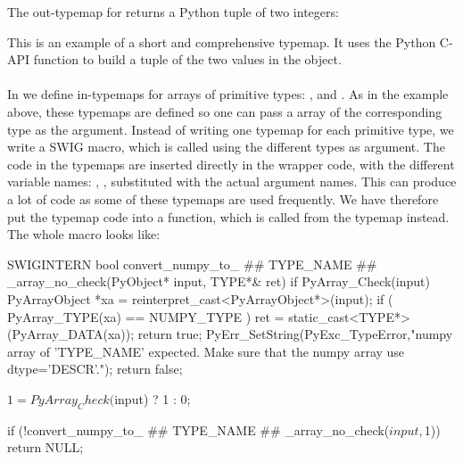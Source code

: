 The out-typemap for \-\- returns a Python tuple of two integers:
This is an example of a short and comprehensive typemap. It uses the Python C-API function  to build a tuple of the two values in the  object.\par

\paragraph{}
In  we define in-typemaps for arrays of primitive types: ,  and . As in the  example above, these typemaps are defined so one can pass a \numpy array of the corresponding type as the argument. Instead of writing one typemap for each primitive type, we write a SWIG macro, which is called using the different types as argument. The code in the typemaps are inserted directly in the wrapper code, with the different variable names:  , , substituted with the actual argument names. This can produce a lot of code as some of these typemaps are used frequently. We have therefore put the typemap code into a function, which is called from the typemap instead. The whole macro looks like:
\begin{c++}
SWIGINTERN bool convert_numpy_to_ ## TYPE_NAME ## _array_no_check(PyObject* input, TYPE*& ret)
{
  if PyArray_Check(input)
  {
    PyArrayObject *xa = reinterpret_cast<PyArrayObject*>(input);
    if ( PyArray_TYPE(xa) == NUMPY_TYPE )
    {
      ret  = static_cast<TYPE*>(PyArray_DATA(xa));
      return true;
    }
  }
  PyErr_SetString(PyExc_TypeError,"numpy array of 'TYPE_NAME' expected. Make sure that the numpy array use dtype='DESCR'.");
  return false;
}

{
    $1 = PyArray_Check($input) ? 1 : 0;
}

{
if (!convert_numpy_to_ ## TYPE_NAME ## _array_no_check($input,$1))
    return NULL;
}

\end{c++}
